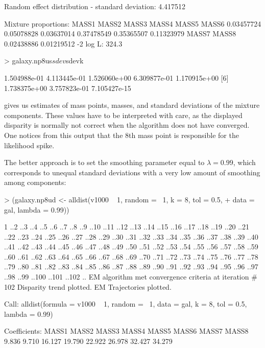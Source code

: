 \documentclass[a4paper]{article}
\begin{document}
\begin{landscape}
\begin{Schunk}
\begin{Soutput}
Random effect distribution - standard deviation:	   4.417512 

Mixture proportions:
     MASS1       MASS2       MASS3       MASS4       MASS5       MASS6  
0.03457724  0.05078828  0.03637014  0.37478549  0.35365507  0.11323979  
     MASS7       MASS8  
0.02438886  0.01219512  
-2 log L:	    324.3 
\end{Soutput}
\begin{Sinput}
> galaxy.np8us$sdev$sdevk
\end{Sinput}
\begin{Soutput}
[1] 1.504988e-01 4.113445e-01 1.526060e+00 6.309877e-01 1.170915e+00
[6] 1.738375e+00 3.757823e-01 7.105427e-15
\end{Soutput}
\end{Schunk}

\noindent gives us  estimates of mass points, masses, and standard deviations of the mixture components. These values 
have to be interpreted with care, as the displayed disparity is normally not correct when the algorithm does not have converged. 
One notices from this output that the 8th mass point is responsible for the likelihood spike.

The better approach is to set the smoothing parameter equal to $\lambda=0.99$, 
which corresponds to unequal standard deviations with a very low amount
of smoothing among components:
\begin{Schunk}
\begin{Sinput}
> (galaxy.np8ud <- alldist(v1000 ~ 1, random = ~1, k = 8, tol = 0.5, 
+     data = gal, lambda = 0.99))
\end{Sinput}
\begin{Soutput}
1 ..2 ..3 ..4 ..5 ..6 ..7 ..8 ..9 ..10 ..11 ..12 ..13 ..14 ..15 ..16 ..17 ..18 ..19 ..20 ..21 ..22 ..23 ..24 ..25 ..26 ..27 ..28 ..29 ..30 ..31 ..32 ..33 ..34 ..35 ..36 ..37 ..38 ..39 ..40 ..41 ..42 ..43 ..44 ..45 ..46 ..47 ..48 ..49 ..50 ..51 ..52 ..53 ..54 ..55 ..56 ..57 ..58 ..59 ..60 ..61 ..62 ..63 ..64 ..65 ..66 ..67 ..68 ..69 ..70 ..71 ..72 ..73 ..74 ..75 ..76 ..77 ..78 ..79 ..80 ..81 ..82 ..83 ..84 ..85 ..86 ..87 ..88 ..89 ..90 ..91 ..92 ..93 ..94 ..95 ..96 ..97 ..98 ..99 ..100 ..101 ..102 ..
EM algorithm met convergence criteria at iteration #  102 
Disparity trend plotted.
EM Trajectories plotted.

Call:  alldist(formula = v1000 ~ 1, random = ~1, data = gal, k = 8,      tol = 0.5, lambda = 0.99) 

Coefficients:
 MASS1   MASS2   MASS3   MASS4   MASS5   MASS6   MASS7   MASS8  
 9.836   9.710  16.127  19.790  22.922  26.978  32.427  34.279  


\end{Soutput}
\end{Schunk}
\end{landscape}
\end{document}
